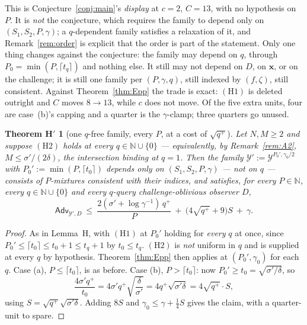 \documentclass{aicr-solution}
\newcommand{\Adv}{\mathsf{Adv}}
\newcommand{\vx}{\mathbf{x}}
\newtheorem*{thmHp}{Theorem H$'$}
\begin{document}
\begin{remark}\label{rem:relaxation}
This is Conjecture~\ref{conj:main}'s \emph{display} at $c = 2$, $C = 13$, with no
hypothesis on $P$. It is \emph{not} the conjecture, which requires the family to
depend only on $(S_1,S_2,P,\gamma)$; a $q$-dependent family satisfies a relaxation
of it, and Remark~\ref{rem:order} is explicit that the order is part of the
statement. Only one thing changes against the conjecture: the family may depend on
$q$, through $P_0 = \min(P,\lceil t_q \rceil)$ and nothing else. It still may not
depend on $D$, on $\vx$, or on the challenge; it is still one family per
$(P,\gamma,q)$, still indexed by $(f,\zeta)$, still consistent. Against
Theorem~\ref{thm:Epp} the trade is exact: $(\mathrm{H1})$ is deleted outright and
$C$ moves $8 \to 13$, while $c$ does not move. Of the five extra units, four are
case~(b)'s capping and a quarter is the $\gamma$-clamp; three quarters go unused.
\end{remark}

\begin{thmHp}[one $q$-free family, every $P$, at a cost of $\sqrt{q^{+}}$]
Let $N,M \ge 2$ and suppose $(\mathrm{H2})$ holds at \emph{every}
$q \in \mathbb{N} \cup \{0\}$ --- equivalently, by Remark~\ref{rem:A2},
$M \le \sigma'/(2\delta)$, the intersection binding at $q = 1$. Then the family
$\mathcal{Y}' := \mathcal{Y}^{P_0',\gamma_0/2}$ with
$P_0' := \min(P, \lceil t_0 \rceil)$ depends only on $(S_1,S_2,P,\gamma)$ --- not
on $q$ --- consists of $P$-mixtures consistent with their indices, and satisfies,
for every $P \in \mathbb{N}$, every $q \in \mathbb{N} \cup \{0\}$ and every
$q$-query challenge-oblivious observer $D$,
\[
  \Adv_{\mathcal{Y}',D}
  \ \le\ \frac{2(\sigma' + \log\gamma^{-1})\,q^{+}}{P}
  \ +\ \bigl(4\sqrt{q^{+}} + 9\bigr) S \ +\ \gamma .
\]
\end{thmHp}

\begin{proof}
As in Lemma~H, with $(\mathrm{H1})$ at $P_0'$ holding for \emph{every}
$q$ at once, since $P_0' \le \lceil t_0 \rceil \le t_0 + 1 \le t_q + 1$ by
$t_0 \le t_q$. $(\mathrm{H2})$ is \emph{not} uniform in $q$ and is supplied at every
$q$ by hypothesis. Theorem~\ref{thm:Epp} then applies at $(P_0',\gamma_0)$ for each
$q$. Case (a), $P \le \lceil t_0 \rceil$, is as before. Case (b),
$P > \lceil t_0 \rceil$: now $P_0' \ge t_0 = \sqrt{\sigma'/\delta}$, so
\[
  \frac{4\sigma' q^{+}}{t_0} = 4\sigma' q^{+}\sqrt{\frac{\delta}{\sigma'}}
  = 4q^{+}\sqrt{\sigma'\delta} = 4\sqrt{q^{+}} \cdot S,
\]
using $S = \sqrt{q^{+}}\sqrt{\sigma'\delta}$. Adding $8S$ and
$\gamma_0 \le \gamma + \tfrac14 S$ gives the claim, with a quarter-unit to spare.
\end{proof}
\end{document}
